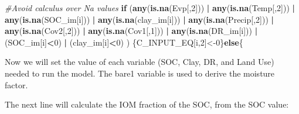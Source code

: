 \documentclass[
  10pt,
  b5paper,
]{book}
\newenvironment{Shaded}{\begin{snugshade}}{\end{snugshade}}
\newcommand{\CommentTok}[1]{\textcolor[rgb]{0.56,0.35,0.01}{\textit{#1}}}
\newcommand{\ControlFlowTok}[1]{\textcolor[rgb]{0.13,0.29,0.53}{\textbf{#1}}}
\newcommand{\DecValTok}[1]{\textcolor[rgb]{0.00,0.00,0.81}{#1}}
\newcommand{\FloatTok}[1]{\textcolor[rgb]{0.00,0.00,0.81}{#1}}
\newcommand{\KeywordTok}[1]{\textcolor[rgb]{0.13,0.29,0.53}{\textbf{#1}}}
\newcommand{\NormalTok}[1]{#1}
\newcommand{\OperatorTok}[1]{\textcolor[rgb]{0.81,0.36,0.00}{\textbf{#1}}}
\newcommand{\StringTok}[1]{\textcolor[rgb]{0.31,0.60,0.02}{#1}}
\begin{document}
\begin{Shaded}
\begin{Highlighting}[]
\CommentTok{#Avoid calculus over Na values }
\ControlFlowTok{if}\NormalTok{ (}\KeywordTok{any}\NormalTok{(}\KeywordTok{is.na}\NormalTok{(Evp[,}\DecValTok{2}\NormalTok{])) }\OperatorTok{|}\StringTok{ }\KeywordTok{any}\NormalTok{(}\KeywordTok{is.na}\NormalTok{(Temp[,}\DecValTok{2}\NormalTok{])) }\OperatorTok{|}\StringTok{ }\KeywordTok{any}\NormalTok{(}\KeywordTok{is.na}\NormalTok{(SOC_im[i])) }\OperatorTok{|}\StringTok{ }\KeywordTok{any}\NormalTok{(}\KeywordTok{is.na}\NormalTok{(clay_im[i])) }\OperatorTok{|}\StringTok{ }\KeywordTok{any}\NormalTok{(}\KeywordTok{is.na}\NormalTok{(Precip[,}\DecValTok{2}\NormalTok{]))  }\OperatorTok{|}\StringTok{  }\KeywordTok{any}\NormalTok{(}\KeywordTok{is.na}\NormalTok{(Cov2[,}\DecValTok{2}\NormalTok{]))  }\OperatorTok{|}\StringTok{  }\KeywordTok{any}\NormalTok{(}\KeywordTok{is.na}\NormalTok{(Cov1[,}\DecValTok{1}\NormalTok{]))  }\OperatorTok{|}\StringTok{ }\KeywordTok{any}\NormalTok{(}\KeywordTok{is.na}\NormalTok{(DR_im[i])) }\OperatorTok{|}\StringTok{  }\NormalTok{(SOC_im[i]}\OperatorTok{<}\DecValTok{0}\NormalTok{) }\OperatorTok{|}\StringTok{ }\NormalTok{(clay_im[i]}\OperatorTok{<}\DecValTok{0}\NormalTok{) ) \{C_INPUT_EQ[i,}\DecValTok{2}\NormalTok{]<-}\DecValTok{0}\NormalTok{\}}\ControlFlowTok{else}\NormalTok{\{}
\end{Highlighting}
\end{Shaded}

Now we will set the value of each variable (SOC, Clay, DR, and Land Use) needed to run the model. The bare1 variable is used to derive the moisture factor.

\begin{Shaded}
\end{Shaded}

The next line will calculate the IOM fraction of the SOC, from the SOC value:
\end{document}

